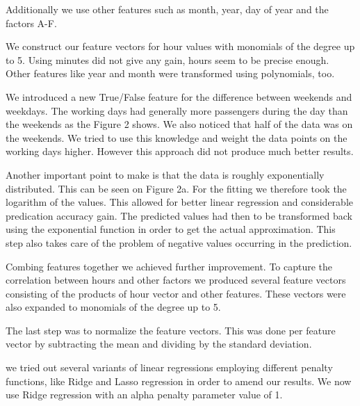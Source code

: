 \documentclass[a4paper, 11pt]{article}
\begin{document}
Additionally we use other features such as month, year, day of year and the factors A-F.

 We construct our feature vectors for hour values with monomials of the degree up to 5. Using minutes did not give any gain, hours seem to be precise enough. Other features like year and month were transformed using polynomials, too.

We introduced a new True/False feature for the difference between weekends and weekdays. The working days had generally more passengers during the day than the weekends as the Figure 2 shows. We also noticed that half of the data was on the weekends. We tried to use this knowledge and weight the data points on the working days higher. However this approach did not produce much better results. 
 
Another important point to make is that the data is roughly exponentially distributed. This can be seen on Figure 2a. For the fitting we therefore took the logarithm of the values. This allowed for better linear regression and considerable predication accuracy gain. The predicted values had then to be transformed back using the exponential function in order to get the actual approximation. This step also takes care of the problem of negative values occurring in the prediction.

Combing features together we achieved further improvement. To capture the correlation between hours and other factors we produced several feature vectors consisting of the products of hour vector and other features. These vectors were also expanded to monomials of the degree up to 5. 

The last step was to normalize the feature vectors. This was done per feature vector by subtracting the mean and dividing by the standard deviation.

we tried out several variants of linear regressions employing different penalty functions, like Ridge and Lasso regression in order to amend our results. We now use Ridge regression with an alpha penalty parameter value of 1.
\end{document}
